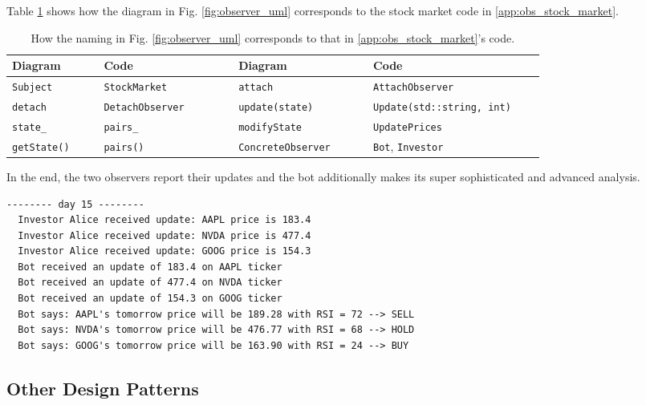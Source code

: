 \documentclass[a4paper]{article}
\begin{document}
Table \ref{tab:obs_uml_to_stock_market_code} shows how the diagram in Fig. \ref{fig:observer_uml} corresponds to the stock market code in \ref{app:obs_stock_market}.
\begin{table}[H]
  \centering
  \begin{tabular}{p{0.15\linewidth}|p{0.22\linewidth}||p{0.22\linewidth}|p{0.29\linewidth}}
    \textbf{Diagram} & \textbf{Code} & \textbf{Diagram} & \textbf{Code} \\
    \midrule
      \texttt{Subject} & \texttt{StockMarket} & \texttt{attach} & \texttt{AttachObserver} \\
      \texttt{detach} & \texttt{DetachObserver} & \texttt{update(state)} & \texttt{Update(std::string, int)} \\
      \texttt{state\_} & \texttt{pairs\_} & \texttt{modifyState} & \texttt{UpdatePrices} \\
      \texttt{getState()} & \texttt{pairs()} & \texttt{ConcreteObserver} & \texttt{Bot}, \texttt{Investor} \\
    \hline
  \end{tabular}
  \caption{How the naming in Fig. \ref{fig:observer_uml} corresponds to that in \ref{app:obs_stock_market}'s code.} \label{tab:obs_uml_to_stock_market_code}
\end{table}

In the end, the two observers report their updates and the bot additionally makes its super sophisticated and advanced analysis.
\begin{verbatim}
-------- day 15 --------
  Investor Alice received update: AAPL price is 183.4
  Investor Alice received update: NVDA price is 477.4
  Investor Alice received update: GOOG price is 154.3
  Bot received an update of 183.4 on AAPL ticker
  Bot received an update of 477.4 on NVDA ticker
  Bot received an update of 154.3 on GOOG ticker
  Bot says: AAPL's tomorrow price will be 189.28 with RSI = 72 --> SELL
  Bot says: NVDA's tomorrow price will be 476.77 with RSI = 68 --> HOLD
  Bot says: GOOG's tomorrow price will be 163.90 with RSI = 24 --> BUY
\end{verbatim}






\subsection{Other Design Patterns}
\end{document}
